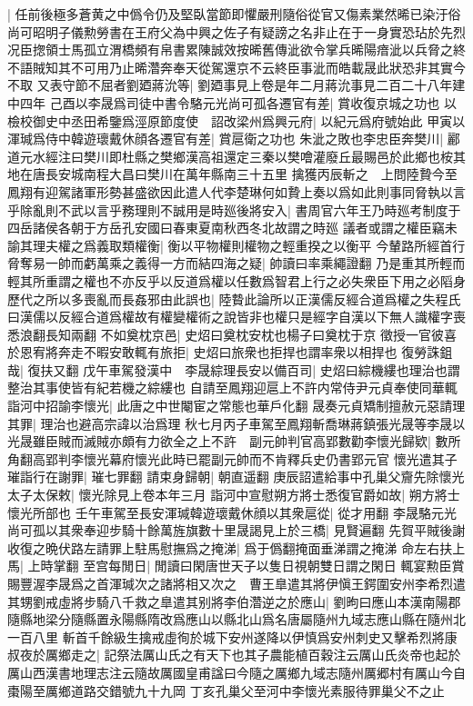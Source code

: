 |{
	任前後極多蒼黄之中僞令仍及堅臥當節即懼嚴刑隨俗從官又傷素業然晞已染汙俗尚可昭明子儀勲勞書在王府父為中興之佐子有疑謗之名非止在于一身實恐玷於先烈况臣揔領士馬孤立渭橋頻有帛書累陳誠效按晞舊傳泚欲令掌兵晞陽瘖泚以兵脅之終不語賊知其不可用乃止晞濳奔奉天從駕還京不云終臣事泚而皓載晟此狀恐非其實今不取}
又表守節不屈者劉廼蔣沇等|{
	劉廼事見上卷是年二月蔣沇事見二百二十八年建中四年}
己酉以李晟爲司徒中書令駱元光尚可孤各遷官有差|{
	賞收復京城之功也}
以檢校御史中丞田希鑒爲涇原節度使　詔改梁州爲興元府|{
	以紀元爲府號始此}
甲寅以渾瑊爲侍中韓遊瓌戴休顔各遷官有差|{
	賞扈衛之功也}
朱泚之敗也李忠臣奔樊川|{
	酈道元水經注曰樊川即杜縣之樊鄉漢高祖還定三秦以樊噲灌廢丘最賜邑於此鄉也桉其地在唐長安城南程大昌曰樊川在萬年縣南三十五里}
擒獲丙辰斬之　上問陸贄今至鳳翔有迎駕諸軍形勢甚盛欲因此遣人代李楚琳何如贄上奏以爲如此則事同脅執以言乎除亂則不武以言乎務理則不誠用是時廵後將安入|{
	書周官六年王乃時廵考制度于四岳諸侯各朝于方岳孔安國曰春東夏南秋西冬北故謂之時廵}
議者或謂之權臣竊未諭其理夫權之爲義取類權衡|{
	衡以平物權則權物之輕重揆之以衡平}
今輦路所經首行脅奪易一帥而虧萬乘之義得一方而結四海之疑|{
	帥讀曰率乘繩證翻}
乃是重其所輕而輕其所重謂之權也不亦反乎以反道爲權以任數爲智君上行之必失衆臣下用之必䧟身歷代之所以多喪亂而長姦邪由此誤也|{
	陸䞇此論所以正漢儒反經合道爲權之失程氏曰漢儒以反經合道爲權故有權變權術之說皆非也權只是經字自漢以下無人識權字喪悉浪翻長知兩翻}
不如奠枕京邑|{
	史炤曰奠枕安枕也楊子曰奠枕于京}
徵授一官彼喜於恩宥將奔走不暇安敢輒有旅拒|{
	史炤曰旅衆也拒捍也謂率衆以相捍也}
復勞誅鉏哉|{
	復扶又翻}
戊午車駕發漢中　李晟綜理長安以備百司|{
	史炤曰綜機縷也理治也謂整治其事使皆有紀若機之綜縷也}
自請至鳳翔迎扈上不許内常侍尹元貞奉使同華輒詣河中招諭李懷光|{
	此唐之中世閹宦之常態也華戶化翻}
晟奏元貞矯制擅赦元惡請理其罪|{
	理治也避高宗諱以治爲理}
秋七月丙子車駕至鳳翔斬喬琳蔣鎮張光晟等李晟以光晟雖臣賊而滅賊亦頗有力欲全之上不許　副元帥判官高郢數勸李懷光歸欵|{
	數所角翻高郢判李懷光幕府懷光此時已罷副元帥而不肯釋兵史仍書郢元官}
懷光遣其子璀詣行在謝罪|{
	璀七罪翻}
請束身歸朝|{
	朝直遥翻}
庚辰詔遣給事中孔巢父齎先除懷光太子太保敕|{
	懷光除見上卷本年三月}
詣河中宣慰朔方將士悉復官爵如故|{
	朔方將士懷光所部也}
壬午車駕至長安渾瑊韓遊瓌戴休顔以其衆扈從|{
	從才用翻}
李晟駱元光尚可孤以其衆奉迎步騎十餘萬旌旗數十里晟謁見上於三橋|{
	見賢遍翻}
先賀平賊後謝收復之晩伏路左請罪上駐馬慰撫爲之掩涕|{
	爲于僞翻掩面垂涕謂之掩涕}
命左右扶上馬|{
	上時掌翻}
至宫每閒日|{
	閒讀曰閑唐世天子以隻日視朝雙日謂之閑日}
輒宴勲臣賞賜豐渥李晟爲之首渾瑊次之諸將相又次之　曹王臯遣其將伊愼王鍔圍安州李希烈遣其甥劉戒虛將步騎八千救之臯遣其别將李伯濳逆之於應山|{
	劉昫曰應山本漢南陽郡隨縣地梁分隨縣置永陽縣隋改爲應山以縣北山爲名唐屬隨州九域志應山縣在隨州北一百八里}
斬首千餘級生擒戒虛徇於城下安州遂降以伊慎爲安州刺史又擊希烈將康叔夜於厲鄉走之|{
	記祭法厲山氏之有天下也其子農能植百穀注云厲山氏炎帝也起於厲山西漢書地理志注云隨故厲國皇甫諡曰今隨之厲鄉九域志隨州厲郷村有厲山今自棗陽至厲鄉道路交錯號九十九岡}
丁亥孔巢父至河中李懷光素服待罪巢父不之止

